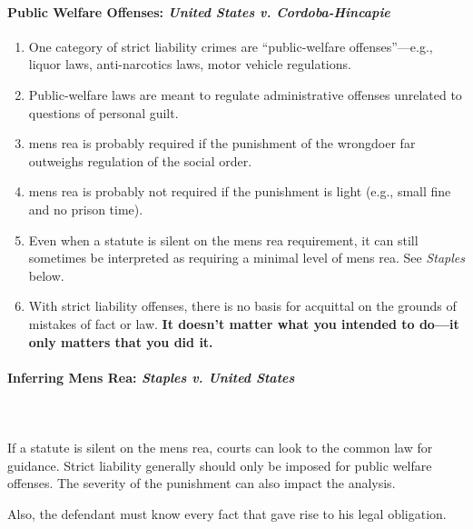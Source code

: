 \paragraph{Public Welfare Offenses: \emph{United States v. Cordoba-Hincapie}}

\begin{enumerate}
    \item One category of strict liability crimes are ``public-welfare 
    offenses''---e.g., liquor laws, anti-narcotics laws, motor vehicle 
    regulations.
    \item Public-welfare laws are meant to regulate administrative offenses 
    unrelated to questions of personal guilt.
    \item mens rea is probably required if the punishment of the wrongdoer far 
    outweighs regulation of the social order.
    \item mens rea is probably not required if the punishment is light (e.g., 
    small fine and no prison time).
    \item Even when a statute is silent on the mens rea requirement, it can 
    still sometimes be interpreted as requiring a minimal level of mens rea. 
    See \emph{Staples} below.
    \item With strict liability offenses, there is no basis for acquittal on 
    the grounds of mistakes of fact or law. \textbf{It doesn't matter what you 
    intended to do---it only matters that you did it.}
\end{enumerate}

\paragraph{Inferring Mens Rea: \emph{Staples v. United States}}
~\\\\
If a statute is silent on the mens rea, courts can look to the common law for 
guidance. Strict liability generally should only be imposed for public welfare 
offenses. The severity of the punishment can also impact the analysis.

Also, the defendant must know every fact that gave rise to his legal 
obligation.

